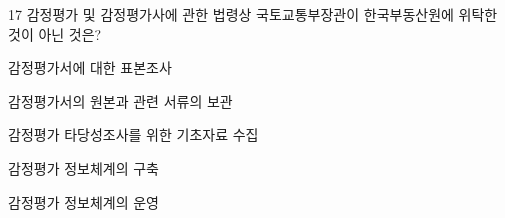 \begin{question}{17}
감정평가 및 감정평가사에 관한 법령상 국토교통부장관이 한국부동산원에 위탁한 것이 아닌 것은?
\begin{choices}
  \item 감정평가서에 대한 표본조사
  \item 감정평가서의 원본과 관련 서류의 보관
  \item 감정평가 타당성조사를 위한 기초자료 수집
  \item 감정평가 정보체계의 구축
  \item 감정평가 정보체계의 운영
\end{choices}
\end{question}
